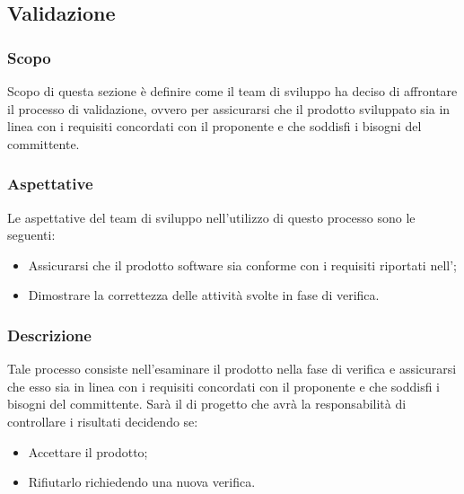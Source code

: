 \pagebreak

\subsection{Validazione}\label{subsection: validazione}
\subsubsection{Scopo}
Scopo di questa sezione è definire come il team di sviluppo ha deciso di affrontare il processo di validazione, ovvero per assicurarsi che il prodotto sviluppato sia in linea con i requisiti concordati con il proponente e che soddisfi i bisogni del committente.
\subsubsection{Aspettative}
Le aspettative del team di sviluppo nell'utilizzo di questo processo sono le seguenti: 
\begin{itemize}
    \item Assicurarsi che il prodotto software sia conforme con i requisiti riportati nell'\docNameAdRLow;
    \item  Dimostrare la correttezza delle attività svolte in fase di verifica.
\end{itemize}
\subsubsection{Descrizione}
Tale processo consiste nell'esaminare il prodotto nella fase di verifica e assicurarsi che esso sia in linea con i requisiti concordati con il proponente e che soddisfi i bisogni del committente.
Sarà il \roleProjectManagerLow{} di progetto che avrà la responsabilità di controllare i risultati decidendo se:
\begin{itemize}
    \item Accettare il prodotto;
    \item Rifiutarlo richiedendo una nuova verifica.
\end{itemize}